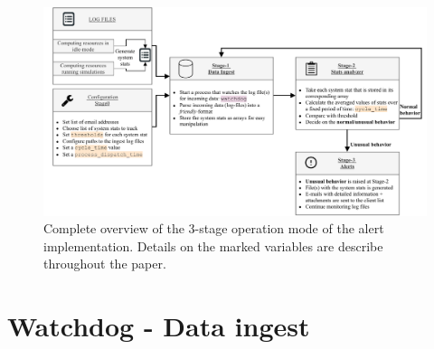 \documentclass[conference]{IEEEtran}
\begin{document}
\begin{figure}[htbp]
    \centering
    \includegraphics[scale=0.2]{figs/alert_system_operation_mode.pdf}
    \caption{Complete overview of the 3-stage operation mode of the alert implementation. Details on the marked variables are describe throughout the paper.}
    \label{fig-operation-mode}
\end{figure}

\section{Watchdog - Data ingest}
\label{section-data-ingest}
\end{document}
